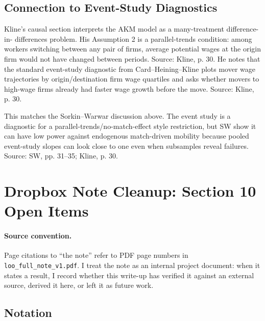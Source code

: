 \documentclass[11pt]{article}
\begin{document}
\subsection{Connection to Event-Study Diagnostics}

Kline's causal section interprets the AKM model as a many-treatment difference-in-
differences problem. His Assumption 2 is a parallel-trends condition: among workers
switching between any pair of firms, average potential wages at the origin firm would
not have changed between periods. Source: Kline, p. 30. He notes that the standard
event-study diagnostic from Card--Heining--Kline plots mover wage trajectories by
origin/destination firm wage quartiles and asks whether movers to high-wage firms
already had faster wage growth before the move. Source: Kline, p. 30.

This matches the Sorkin--Warwar discussion above. The event study is a diagnostic
for a parallel-trends/no-match-effect style restriction, but SW show it can have low
power against endogenous match-driven mobility because pooled event-study slopes can
look close to one even when subsamples reveal failures. Source: SW, pp. 31--35; Kline,
p. 30.

\section{Dropbox Note Cleanup: Section 10 Open Items}

\paragraph{Source convention.}
Page citations to ``the note'' refer to PDF page numbers in
\texttt{loo\_full\_note\_v1.pdf}. I treat the note as an internal project document:
when it states a result, I record whether this write-up has verified it against an
external source, derived it here, or left it as future work.

\subsection{Notation}
\end{document}
